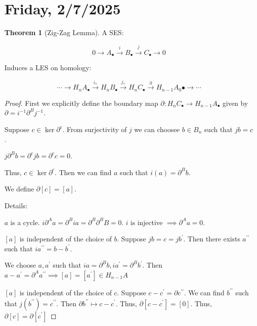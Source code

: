 \documentclass{article}
\theoremstyle{definition}
\newtheorem{theorem}{Theorem}
\begin{document}
    \section*{Friday, 2/7/2025}
    
    \begin{theorem}
        [Zig-Zag Lemma] A SES:

        \[
            0 \to A_\bullet \xrightarrow{i} B_\bullet \xrightarrow{j} C_{\bullet} \to 0
        \]

        Induces a LES on homology:

        \[
            \cdots \to H_n A_\bullet  \xrightarrow{i_{\ast}} H_n B_\bullet \xrightarrow{j_{\ast}} H_n C_\bullet \xrightarrow{\partial} H_{n-1} A_0\bullet \to \cdots 
        \]
    \end{theorem}

    \begin{proof}
        First we explicitly define the boundary map \(\partial: H_n C_\bullet \to H_{n-1} A_\bullet\) given by \(\partial = i ^{-1} \partial^B j ^{-1}\).

        Suppose \(c\in \ker \partial^c\). From surjectivity of \(j\) we can choosee \(b\in B_n\) such that \(jb = c\).

        \(j \partial^B b = \partial^c j b = \partial^c c = 0\).

        Thus, \(c\in \ker \partial^c\). Then we can find \(a\) such that \(i(a) = \partial^B b\).

        We define \(\partial [c] = [a]\).

        Details:
        
        \(a\) is a cycle. \(i \partial^A a = \partial^B i a = \partial^B \partial^B B = 0\). \(i\) is injective \(\implies \partial^A a = 0\). 

        \([a]\) is independent of the choice of \(b\).  Suppose \(jb = c = jb^{\prime}\). Then there exists \(a^{\prime\prime}\) such that \(ia^{\prime\prime} = b - b^{\prime}\).

        We choose \(a, a^{\prime}\) such that \(ia = \partial^B b, i a^{\prime} = \partial ^B b^{\prime}\). Then \(a - a^{\prime} = \partial^A a^{\prime\prime} \implies [a]=[a^{\prime}] \in H_{n-1}A\)

        \([a]\) is independent of the choice of \(c\). Suppose \(c - c^{\prime} = \partial c^{\prime\prime}\). We can find \(b^{\prime\prime}\) such that \(j(b^{\prime\prime}) = c^{\prime\prime}\). Then \(\partial b^{\prime\prime} \mapsto c - c^{\prime}\). Thus, \(\partial [c-c^{\prime}] = [0]\). Thus, \(\partial [c]= \partial [c^{\prime}]\)  

    \end{proof}
\end{document}
